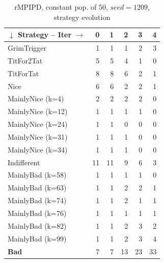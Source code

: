 \documentclass[journal,10pt,twoside]{IEEEtran}
\begin{document}
\begin{table}[ht]
    \caption{rMPIPD, constant pop. of 50, $seed = 1209$, strategy evolution}
    \label{tab:ripdmp-const-1209}
    \centering
    \begin{tabular}{l|rrrrr} \toprule
        $\downarrow$ Strategy -- Iter $\rightarrow$  & 0 & 1 & 2 & 3 & 4 \\ \midrule
        GrimTrigger       &   1 &   1 &   1 &   2 &   3 \\
        TitFor2Tat        &   5 &   5 &   4 &   1 &   0 \\
        TitForTat         &   8 &   8 &   6 &   2 &   1 \\
        Nice              &   6 &   6 &   2 &   2 &   1 \\
        MainlyNice (k=4)  &   2 &   2 &   2 &   2 &   0 \\
        MainlyNice (k=12) &   1 &   1 &   1 &   1 &   0 \\
        MainlyNice (k=24) &   1 &   1 &   0 &   0 &   0 \\
        MainlyNice (k=31) &   1 &   1 &   1 &   0 &   0 \\
        MainlyNice (k=34) &   1 &   1 &   1 &   0 &   0 \\
        Indifferent       &  11 &  11 &   9 &   6 &   3 \\
        MainlyBad (k=58)  &   1 &   1 &   1 &   1 &   0 \\
        MainlyBad (k=63)  &   1 &   1 &   2 &   2 &   1 \\
        MainlyBad (k=74)  &   1 &   1 &   2 &   1 &   1 \\
        MainlyBad (k=76)  &   1 &   1 &   1 &   1 &   1 \\
        MainlyBad (k=82)  &   1 &   1 &   2 &   3 &   2 \\
        MainlyBad (k=99)  &   1 &   1 &   2 &   3 &   4 \\
        \textbf{Bad}      &   7 &   7 &  13 &  23 &  33 \\ \bottomrule
    \end{tabular}
\end{table}
\end{document}
